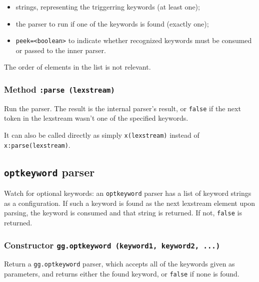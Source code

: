\begin{itemize}
\item strings, representing the triggerring keywords (at least one);
\item the parser to run if one of the keywords is found (exactly one);
\item \verb|peek=<boolean>| to indicate whether recognized keywords
  must be consumed or passed to the inner parser.
\end{itemize}
The order of elements in the list is not relevant.

\subsubsection{Method {\tt :parse (lexstream)}}

Run the parser. The result is the internal parser's result, or
\verb|false| if the next token in the lexstream wasn't one of the
specified keywords.

It can also be called directly as simply \verb|x(lexstream)| instead of
\verb|x:parse(lexstream)|.

\subsection{{\tt optkeyword} parser}

Watch for optional keywords: an \verb|optkeyword| parser has a list of
keyword strings as a configuration. If such a keyword is found as the
next lexstream element upon parsing, the keyword is consumed and that
string is returned. If not, \verb|false| is returned.

\subsubsection{Constructor {\tt gg.optkeyword (keyword1, keyword2, ...)}}

Return a \verb|gg.optkeyword| parser, which accepts all of the
keywords given as parameters, and returns either the found keyword, or
\verb|false| if none is found.
